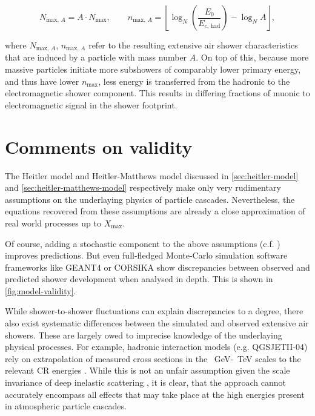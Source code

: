 \begin{equation}
N_{\text{max},\,A} = A \cdot N_{\text{max}}, \qquad n_{\text{max},\,A} = \left\lfloor \log_N\left(\frac{E_0}{E_{c,\,\text{had}}}\right) - \log_N A \right\rfloor,
\end{equation}

where $N_{\text{max},\,A}$, $n_{\text{max},\,A}$ refer to the resulting extensive air shower characteristics that are induced by a particle with mass number $A$.
On top of this, because more massive particles initiate more subshowers of comparably lower primary energy, and thus have lower $n_\text{max}$, less energy is 
transferred from the hadronic to the electromagnetic shower component. This results in differing fractions of muonic to electromagnetic signal in the shower 
footprint.

\section{Comments on validity}
\label{sec:cr-shower-validity}

The Heitler model and Heitler-Matthews model discussed in \autoref{sec:heitler-model} and \autoref{sec:heitler-matthews-model} respectively make only very 
rudimentary assumptions on the underlaying physics of particle cascades. Nevertheless, the equations recovered from these assumptions are already a close 
approximation of real world processes up to $X_\text{max}$. 

Of course, adding a stochastic component to the above assumptions (c.f. \cite{MartinShowerSim}) improves predictions. But even full-fledged Monte-Carlo simulation 
software frameworks like GEANT4 \cite{agostinelli2003geant4} or CORSIKA \cite{heck1998corsika} show discrepancies between observed and predicted shower development
when analysed in depth. This is shown in \autoref{fig:model-validity}. 

While shower-to-shower fluctuations can explain discrepancies to a degree, there also exist systematic differences between the simulated and observed extensive air
showers. These are largely owed to imprecise knowledge of the underlaying physical processes. For example, hadronic interaction models (e.g. QGSJETII-04) rely on 
extrapolation of measured cross sections in the \SI{}{\giga\electronvolt}-\SI{}{\tera\electronvolt} scales to the relevant CR energies \cite{ostapchenko2006qgsjet}. 
While this is not an unfair assumption given the scale invariance of deep inelastic scattering \cite{fox1974early}, it is clear, that the approach cannot accurately 
encompass all effects that may take place at the high energies present in atmospheric particle cascades.

